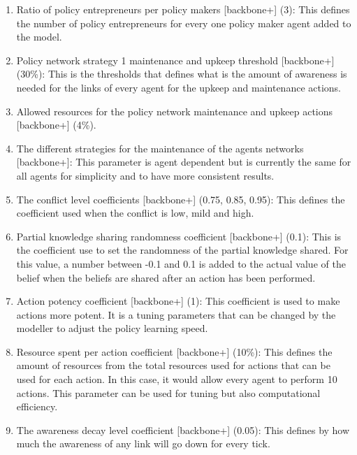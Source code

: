 \begin{enumerate}
\item Ratio of policy entrepreneurs per policy makers [backbone+] (3): This defines the number of policy entrepreneurs for every one policy maker agent added to the model.
\item Policy network strategy 1 maintenance and upkeep threshold [backbone+] (30\%): This is the thresholds that defines what is the amount of awareness is needed for the links of every agent for the upkeep and maintenance actions.
\item Allowed resources for the policy network maintenance and upkeep actions [backbone+] (4\%).
\item The different strategies for the maintenance of the agents networks [backbone+]: This parameter is agent dependent but is currently the same for all agents for simplicity and to have more consistent results.
\item The conflict level coefficients [backbone+] (0.75, 0.85, 0.95): This defines the coefficient used when the conflict is low, mild and high.
\item Partial knowledge sharing randomness coefficient [backbone+] (0.1): This is the coefficient use to set the randomness of the partial knowledge shared. For this value, a number between -0.1 and 0.1 is added to the actual value of the belief when the beliefs are shared after an action has been performed.
\item Action potency coefficient [backbone+] (1): This coefficient is used to make actions more potent. It is a tuning parameters that can be changed by the modeller to adjust the policy learning speed.
\item Resource spent per action coefficient [backbone+] (10\%): This defines the amount of resources from the total resources used for actions that can be used for each action. In this case, it would allow every agent to perform 10 actions. This parameter can be used for tuning but also computational efficiency.
\item The awareness decay level coefficient [backbone+] (0.05): This defines by how much the awareness of any link will go down for every tick.


\end{enumerate}
